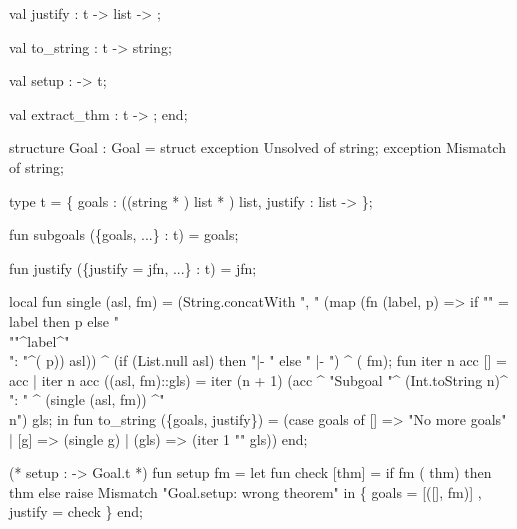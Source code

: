   val justify : t ->  list -> ;
  
  val to_string : t -> string;

  val setup :  -> t;

  val extract_thm : t -> ;
end;
\nwendcode{}\nwdocspar

\nwenddocs{}\endmoddef\nwstartdeflinemarkup\nwenddeflinemarkup
structure Goal : Goal = struct
exception Unsolved of string;
exception Mismatch of string;

type t = \{ goals : ((string * ) list * ) list,
           justify :  list ->  \};

fun subgoals (\{goals, ...\} : t) = goals;

fun justify (\{justify = jfn, ...\} : t) = jfn;

local
  fun single (asl, fm) =
    (String.concatWith
       ", "
       (map (fn (label, p) =>
                if "" = label then  p
                else "\\""^label^"\\": "^( p))
            asl)) ^
    (if (List.null asl) then "|- "
     else " |- ") ^ 
    ( fm);
  fun iter n acc [] = acc
    | iter n acc ((asl, fm)::gls) =
        iter (n + 1)
             (acc ^
              "Subgoal "^
              (Int.toString n)^
              ": " ^
              (single (asl, fm)) ^"\\n")
             gls;
in
fun to_string (\{goals, justify\}) =
 (case goals of
   [] => "No more goals"
 | [g] => (single g)
 | (gls) => (iter 1 "" gls))
end;

(* setup :  -> Goal.t *)
fun setup fm =
  let
    fun check [thm] =
      if  fm ( thm)
      then thm
      else raise Mismatch "Goal.setup: wrong theorem"
  in
    \{ goals = [([], fm)]
    , justify = check \}
  end;

